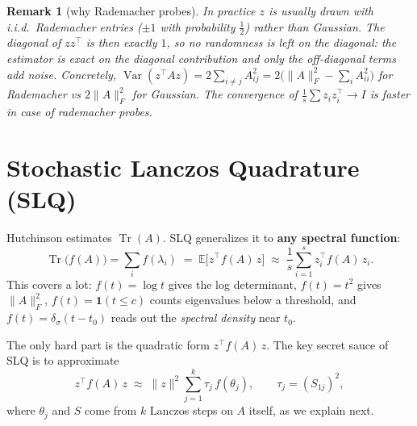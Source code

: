 \documentclass[11pt]{article}
\newtheorem*{remarkbox}{Remark}
\newcommand{\Tr}{\operatorname{Tr}}
\begin{document}
\begin{remarkbox}[why Rademacher probes]
In practice $z$ is usually drawn with i.i.d.\ \emph{Rademacher} entries ($\pm 1$ with probability $\tfrac12$) rather than Gaussian. The diagonal of $zz^\top$ is then \emph{exactly} $1$, so no randomness is left on the diagonal: the estimator is exact on the diagonal contribution and only the off-diagonal terms add noise. Concretely, $\operatorname{Var}(z^\top A z) = 2\sum_{i \ne j} A_{ij}^2 = 2\big(\|A\|_F^2 - \sum_i A_{ii}^2\big)$ for Rademacher vs $2\|A\|_F^2$ for Gaussian. The convergence of $\frac1s\sum z_i z_i^\top \to I$ is faster in case of rademacher probes.
\end{remarkbox}


\section{Stochastic Lanczos Quadrature (SLQ)}

Hutchinson estimates $\Tr(A)$. SLQ generalizes it to \textbf{any spectral function}:
\[
\Tr\big(f(A)\big) = \sum_i f(\lambda_i)
\;=\; \mathbb{E}\big[ z^\top f(A)\, z \big]
\;\approx\; \frac{1}{s} \sum_{i=1}^s z_i^\top f(A)\, z_i .
\]
This covers a lot: $f(t) = \log t$ gives the log determinant, $f(t) = t^2$ gives $\|A\|_F^2$, $f(t) = \mathbf{1}(t \le c)$ counts eigenvalues below a threshold, and $f(t) = \delta_\sigma(t - t_0)$ reads out the \emph{spectral density} near $t_0$.

The only hard part is the quadratic form $z^\top f(A)\, z$. The key secret sauce of SLQ is to approximate
\[
z^\top f(A)\, z \;\approx\; \|z\|^2 \sum_{j=1}^{k} \tau_j\, f(\theta_j),
\qquad \tau_j = (S_{1j})^2 ,
\]
where $\theta_j$ and $S$ come from $k$ Lanczos steps on $A$ itself, as we explain next.

\end{document}
